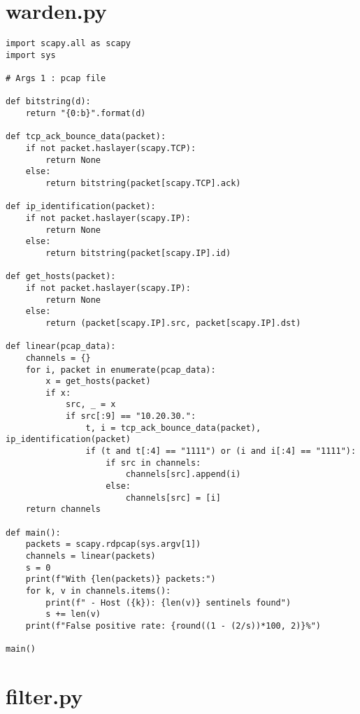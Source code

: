 \section{warden.py}
\label{sec:warden_py}

\begin{listing}[H]
    \vspace{0.5cm}
    \begin{verbatim}
import scapy.all as scapy
import sys

# Args 1 : pcap file

def bitstring(d):
    return "{0:b}".format(d)

def tcp_ack_bounce_data(packet):
    if not packet.haslayer(scapy.TCP):
        return None
    else:
        return bitstring(packet[scapy.TCP].ack)

def ip_identification(packet):
    if not packet.haslayer(scapy.IP):
        return None
    else:
        return bitstring(packet[scapy.IP].id)

def get_hosts(packet):
    if not packet.haslayer(scapy.IP):
        return None
    else:
        return (packet[scapy.IP].src, packet[scapy.IP].dst)

def linear(pcap_data):
    channels = {}
    for i, packet in enumerate(pcap_data):
        x = get_hosts(packet)
        if x:
            src, _ = x
            if src[:9] == "10.20.30.":
                t, i = tcp_ack_bounce_data(packet), ip_identification(packet)
                if (t and t[:4] == "1111") or (i and i[:4] == "1111"):
                    if src in channels:
                        channels[src].append(i)
                    else:
                        channels[src] = [i]
    return channels

def main():
    packets = scapy.rdpcap(sys.argv[1])
    channels = linear(packets)
    s = 0
    print(f"With {len(packets)} packets:")
    for k, v in channels.items():
        print(f" - Host ({k}): {len(v)} sentinels found")
        s += len(v)
    print(f"False positive rate: {round((1 - (2/s))*100, 2)}%")

main()
    \end{verbatim}
\end{listing}

\section{filter.py}
\label{sec:filter_py}

